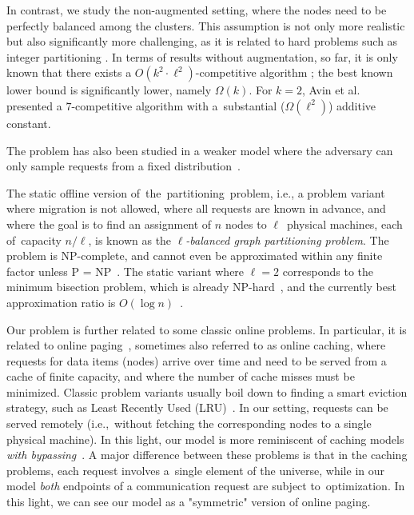 \documentclass[a4paper,anonymous,USenglish]{lipics-v2019}
\begin{document}
In contrast, we study the non-augmented setting, where the nodes need to be perfectly balanced  among the clusters.
This assumption is not only more realistic but also significantly more challenging, as it is related to hard problems such as integer partitioning \cite{integer-partitions-book}.
In terms of results without augmentation, so far, it is only known that there exists a $O(k^2 \cdot \ell^2)$-competitive algorithm \cite{repartition-disc}; the best known lower bound is significantly lower, namely $\Omega(k)$.
For $k=2$, Avin et al.\cite{repartition-disc} presented a $7$-competitive algorithm with a~substantial ($\Omega(\ell^2)$) additive constant.


The problem has also been studied in a weaker
model where the adversary can only sample
requests from a fixed distribution~\cite{stochastic-ring}.

The static offline version of~the~partitioning~problem, i.e., a problem variant where
migration is not allowed, where all requests are known in advance, and where
the goal is to find an assignment of $n$ nodes to $\ell$~physical machines, each of~capacity $n/\ell$, is known as the
\emph{$\ell$-balanced graph partitioning problem}. The problem is 
NP-complete, and cannot even be approximated within any finite factor unless P
= NP~\cite{AndRae06}.  The static
variant where $\ell = 2$ corresponds to the minimum bisection problem, which
is already NP-hard~\cite{GaJoSt76}, and 
the currently best approximation ratio is $O(\log n)$~\cite{SarVaz95,ArKaKa99,FeKrNi00,FeiKra02,KraFei06,Raec08}.

Our problem is further related to some classic online problems.
In particular, it is related to online paging~\cite{SleTar85,FKLMSY91,McGSle91,AcChNo00}, sometimes also referred to
as online caching, where requests for data items (nodes) arrive over time and
need to be served from a cache of finite capacity, and where the number of
cache misses must be minimized. Classic problem variants usually boil down to
finding a smart eviction strategy, such as Least Recently Used (LRU)~\cite{SleTar85}. In our
setting, requests can be served remotely (i.e.,~without fetching the
corresponding nodes to a single physical machine). In this light, our model is more
reminiscent of caching models \emph{with
bypassing}~\cite{EpImLN11,EpImLN15,Irani02}.
A major difference between  these problems is that in the caching problems, each request involves a~single element of the universe, while in our model \emph{both} endpoints of a communication request are subject to~optimization.
In this light, we can see our model as a "symmetric" version of online paging.
\end{document}
